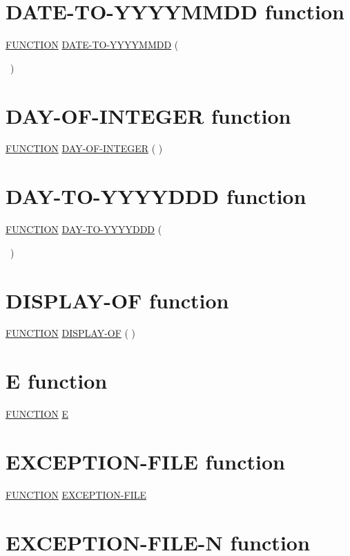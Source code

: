 \documentclass[a4paper,oneside,svgnames]{scrbook}
\makeatletter
\newcommand{\key}[1]{\underline{#1}}
\newcommand{\pending}[1]{%
  \textcolor{gray!75}{#1}}
\newenvironment{0-1}{$\left[ \begin{tabular}{@{}l@{}}}{\end{tabular} \right]$}
\makeatother
\begin{document}
\section{DATE-TO-YYYYMMDD function}

\key{FUNCTION} \key{DATE-TO-YYYYMMDD} (
\argument
\begin{0-1}
  \argument
  \begin{0-1}
    \argument
  \end{0-1}
\end{0-1}
\ {})

\section{DAY-OF-INTEGER function}

\key{FUNCTION} \key{DAY-OF-INTEGER} ( \argument )

\section{DAY-TO-YYYYDDD function}

\key{FUNCTION} \key{DAY-TO-YYYYDDD} (
\argument
\begin{0-1}
  \argument
  \begin{0-1}
    \argument
  \end{0-1}
\end{0-1}
\ {})

\section{DISPLAY-OF function}

\pending{
  \key{FUNCTION} \key{DISPLAY-OF} ( \argument )
}

\section{E function}

\key{FUNCTION} \key{E}

\section{EXCEPTION-FILE function}

\key{FUNCTION} \key{EXCEPTION-FILE}

\section{EXCEPTION-FILE-N function}
\end{document}
